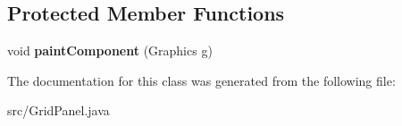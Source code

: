 \subsection*{Protected Member Functions}
\begin{DoxyCompactItemize}
\item 
void {\bfseries paint\+Component} (Graphics g)\hypertarget{classGridPanel_ae44d617ba15ff9b1778cc4c713151650}{}\label{classGridPanel_ae44d617ba15ff9b1778cc4c713151650}

\end{DoxyCompactItemize}


The documentation for this class was generated from the following file\+:\begin{DoxyCompactItemize}
\item 
src/Grid\+Panel.\+java\end{DoxyCompactItemize}
